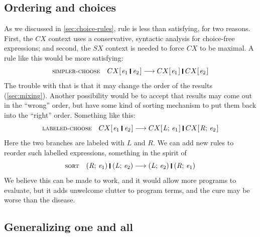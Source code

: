 \documentclass[acmsmall,review,anonymous,dvipsnames]{acmart}
\newcommand{\Conid}[1]{\mathit{#1}}
\newcommand{\Varid}[1]{\mathit{#1}}
\begin{document}
\subsection{Ordering and choices}

As we discussed in \cref{sec:choice-rules}, rule  is less than satisfying, for two reasons.
First, the \ensuremath{CX} context uses a conservative, syntactic analysis for choice-free expressions; and second,
the \ensuremath{\Conid{SX}} context is needed to force \ensuremath{CX} to be maximal.  A rule like this would be more satisfying:
$$
\rulename{simpler-choose} \quad   \ensuremath{CX [\mskip1.5mu \Varid{e}_{\mathrm{1}}\;\rule[-0.3mm]{0.5mm}{2.5mm}\;\Varid{e}_{\mathrm{2}}\mskip1.5mu]} \movesto \ensuremath{CX [\mskip1.5mu \Varid{e}_{\mathrm{1}}\mskip1.5mu]\;\rule[-0.3mm]{0.5mm}{2.5mm}\;CX [\mskip1.5mu \Varid{e}_{\mathrm{2}}\mskip1.5mu]}
$$
The trouble with that is that it may change the order of the results (\cref{sec:mixing}).
Another possibility would be to accept that results may come out in the ``wrong'' order, but have
some kind of sorting mechanism to put them back into the ``right'' order.  Something like this:
$$
\rulename{labeled-choose} \quad   \ensuremath{CX [\mskip1.5mu \Varid{e}_{\mathrm{1}}\;\rule[-0.3mm]{0.5mm}{2.5mm}\;\Varid{e}_{\mathrm{2}}\mskip1.5mu]} \movesto \ensuremath{CX [\mskip1.5mu \Conid{L};\,\Varid{e}_{\mathrm{1}}\mskip1.5mu]\;\rule[-0.3mm]{0.5mm}{2.5mm}\;CX [\mskip1.5mu \Conid{R};\,\Varid{e}_{\mathrm{2}}\mskip1.5mu]}
$$
Here the two branches are labeled with \ensuremath{\Conid{L}} and \ensuremath{\Conid{R}}.  We can add new rules to reorder such
labelled expressions, something in the spirit of
$$
\rulename{sort} \quad   \ensuremath{(\Conid{R};\,\Varid{e}_{\mathrm{1}})\;\rule[-0.3mm]{0.5mm}{2.5mm}\;(\Conid{L};\,\Varid{e}_{\mathrm{2}})} \movesto \ensuremath{(\Conid{L};\,\Varid{e}_{\mathrm{2}})\;\rule[-0.3mm]{0.5mm}{2.5mm}\;(\Conid{R};\,\Varid{e}_{\mathrm{1}})}
$$
We believe this can be made to work, and it would allow more programs to evaluate, but it adds unwelcome clutter to program terms, and the cure
may be worse than the disease.

\subsection{Generalizing \ensuremath{\textbf{one}} and \ensuremath{\textbf{all}}}
\end{document}
